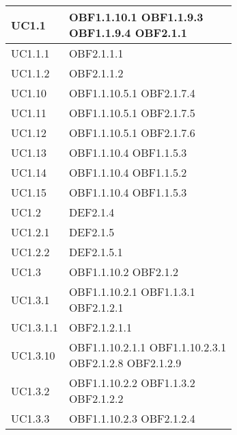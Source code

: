\documentclass{scalatekids-article}
\begin{document}
\begin{longtable}[H]{|p{5.5cm}|p{5.5cm}|}
\hline
UC1.1 & \multiLineCell[t]{OBF1.1.10.1 OBF1.1.9.3\\OBF1.1.9.4 OBF2.1.1\\}\\
\hline
UC1.1.1 & \multiLineCell[t]{OBF2.1.1.1\\}\\
\hline
UC1.1.2 & \multiLineCell[t]{OBF2.1.1.2\\}\\
\hline
UC1.10 & \multiLineCell[t]{OBF1.1.10.5.1 OBF2.1.7.4\\}\\
\hline
UC1.11 & \multiLineCell[t]{OBF1.1.10.5.1 OBF2.1.7.5\\}\\
\hline
UC1.12 & \multiLineCell[t]{OBF1.1.10.5.1 OBF2.1.7.6\\}\\
\hline
UC1.13 & \multiLineCell[t]{OBF1.1.10.4 OBF1.1.5.3\\}\\
\hline
UC1.14 & \multiLineCell[t]{OBF1.1.10.4 OBF1.1.5.2\\}\\
\hline
UC1.15 & \multiLineCell[t]{OBF1.1.10.4 OBF1.1.5.3\\}\\
\hline
UC1.2 & \multiLineCell[t]{DEF2.1.4\\}\\
\hline
UC1.2.1 & \multiLineCell[t]{DEF2.1.5\\}\\
\hline
UC1.2.2 & \multiLineCell[t]{DEF2.1.5.1\\}\\
\hline
UC1.3 & \multiLineCell[t]{OBF1.1.10.2 OBF2.1.2\\}\\
\hline
UC1.3.1 & \multiLineCell[t]{OBF1.1.10.2.1 OBF1.1.3.1\\OBF2.1.2.1}\\
\hline
UC1.3.1.1 & \multiLineCell[t]{OBF2.1.2.1.1\\}\\
\hline
UC1.3.10 & \multiLineCell[t]{OBF1.1.10.2.1.1 OBF1.1.10.2.3.1\\OBF2.1.2.8 OBF2.1.2.9\\}\\
\hline
UC1.3.2 & \multiLineCell[t]{OBF1.1.10.2.2 OBF1.1.3.2\\OBF2.1.2.2}\\
\hline
UC1.3.3 & \multiLineCell[t]{OBF1.1.10.2.3 OBF2.1.2.4\\}\\

\end{longtable}
\end{document}

